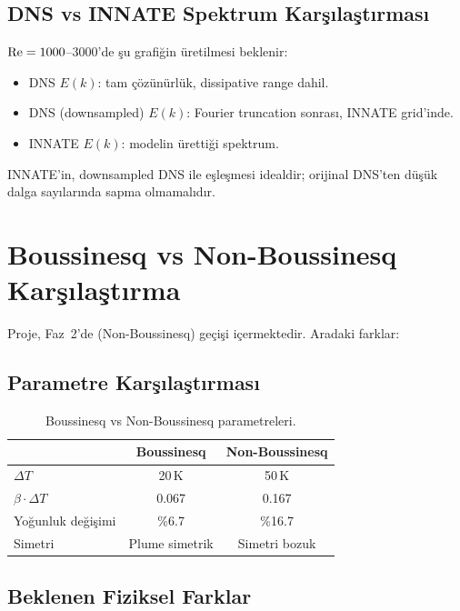 \subsection{DNS vs INNATE Spektrum Karşılaştırması}

$\mathrm{Re} = 1000$--$3000$'de şu grafiğin üretilmesi beklenir:
\begin{itemize}
    \item DNS $E(k)$: tam çözünürlük, dissipative range dahil.
    \item DNS (downsampled) $E(k)$: Fourier truncation sonrası, INNATE grid'inde.
    \item INNATE $E(k)$: modelin ürettiği spektrum.
\end{itemize}
INNATE'in, downsampled DNS ile eşleşmesi idealdir; orijinal DNS'ten düşük dalga sayılarında sapma olmamalıdır.


\section{Boussinesq vs Non-Boussinesq Karşılaştırma}
\label{sec:non_boussinesq}

Proje, Faz~2'de (Non-Boussinesq) geçişi içermektedir. Aradaki farklar:

\subsection{Parametre Karşılaştırması}

\begin{table}[H]
\centering
\caption{Boussinesq vs Non-Boussinesq parametreleri.}
\label{tab:bous_vs_nonbous}
\begin{tabular}{lcc}
\toprule
 & \textbf{Boussinesq} & \textbf{Non-Boussinesq} \\
\midrule
$\Delta T$                & 20\,K     & 50\,K \\
$\beta \cdot \Delta T$    & 0.067     & 0.167 \\
Yoğunluk değişimi & \%6.7 & \%16.7 \\
Simetri                   & Plume simetrik & Simetri bozuk \\
\bottomrule
\end{tabular}
\end{table}

\subsection{Beklenen Fiziksel Farklar}

